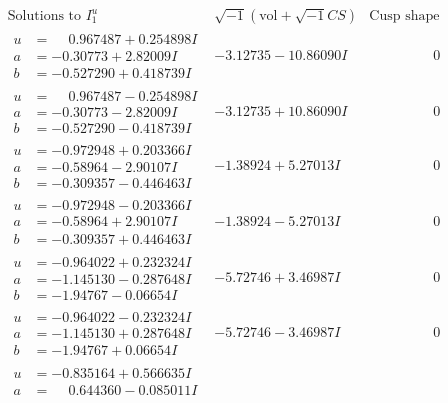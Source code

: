 \documentclass[1p]{elsarticle_modified}
\theoremstyle{definition}
\newcommand{\I}{\sqrt{-1}}
\begin{document}
$$\begin{array}{c|c|c}  
\text{Solutions to }I^u_{1}& \I (\text{vol} + \sqrt{-1}CS) & \text{Cusp shape}\\
 \hline 
\begin{aligned}
u &= \phantom{-}0.967487 + 0.254898 I \\
a &= -0.30773 + 2.82009 I \\
b &= -0.527290 + 0.418739 I\end{aligned}
 & -3.12735 - 10.86090 I & \phantom{-0.000000 } 0 \\ \hline\begin{aligned}
u &= \phantom{-}0.967487 - 0.254898 I \\
a &= -0.30773 - 2.82009 I \\
b &= -0.527290 - 0.418739 I\end{aligned}
 & -3.12735 + 10.86090 I & \phantom{-0.000000 } 0 \\ \hline\begin{aligned}
u &= -0.972948 + 0.203366 I \\
a &= -0.58964 - 2.90107 I \\
b &= -0.309357 - 0.446463 I\end{aligned}
 & -1.38924 + 5.27013 I & \phantom{-0.000000 } 0 \\ \hline\begin{aligned}
u &= -0.972948 - 0.203366 I \\
a &= -0.58964 + 2.90107 I \\
b &= -0.309357 + 0.446463 I\end{aligned}
 & -1.38924 - 5.27013 I & \phantom{-0.000000 } 0 \\ \hline\begin{aligned}
u &= -0.964022 + 0.232324 I \\
a &= -1.145130 - 0.287648 I \\
b &= -1.94767 - 0.06654 I\end{aligned}
 & -5.72746 + 3.46987 I & \phantom{-0.000000 } 0 \\ \hline\begin{aligned}
u &= -0.964022 - 0.232324 I \\
a &= -1.145130 + 0.287648 I \\
b &= -1.94767 + 0.06654 I\end{aligned}
 & -5.72746 - 3.46987 I & \phantom{-0.000000 } 0 \\ \hline\begin{aligned}
u &= -0.835164 + 0.566635 I \\
a &= \phantom{-}0.644360 - 0.085011 I \\

\end{aligned}
\end{array}$$
\end{document}
